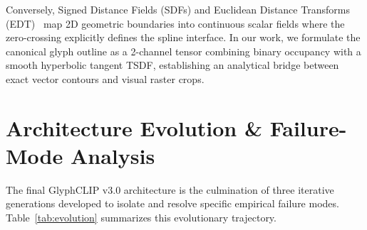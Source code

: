 \documentclass[10pt,twocolumn,letterpaper]{article}
\begin{document}
Conversely, Signed Distance Fields (SDFs) and Euclidean Distance Transforms (EDT)~\cite{Felzenszwalb2012DistanceTO} map 2D geometric boundaries into continuous scalar fields where the zero-crossing explicitly defines the spline interface. In our work, we formulate the canonical glyph outline as a 2-channel tensor combining binary occupancy with a smooth hyperbolic tangent TSDF, establishing an analytical bridge between exact vector contours and visual raster crops.

\section{Architecture Evolution \& Failure-Mode Analysis}

The final GlyphCLIP v3.0 architecture is the culmination of three iterative generations developed to isolate and resolve specific empirical failure modes. Table~\ref{tab:evolution} summarizes this evolutionary trajectory.

\begin{table}[t]
\centering
\small
\caption{\textbf{Architectural Evolution of GlyphCLIP across Generations.} Systematic benchmarking on identical font corpora illustrates how progressive innovations resolved critical failure modes.}
\label{tab:evolution}
\end{table}
\end{document}
